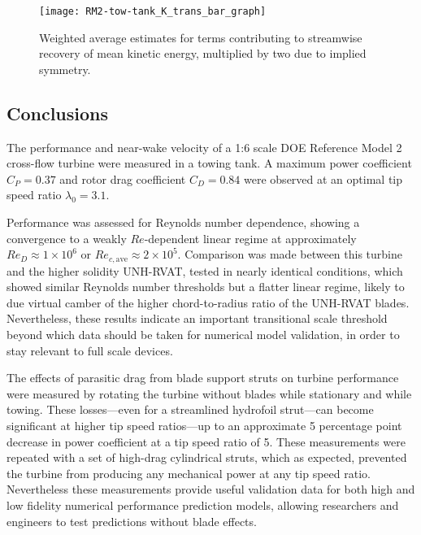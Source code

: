 \begin{figure}
    \centering

    \texttt{[image: RM2-tow-tank\_K\_trans\_bar\_graph]}
    
    \caption{Weighted average estimates for terms contributing to streamwise
        recovery of mean kinetic energy, multiplied by two due to implied symmetry.}
    
    \label{fig:Ktransport}
\end{figure}


\subsection{Conclusions}

The performance and near-wake velocity of a 1:6 scale DOE Reference Model 2
cross-flow turbine were measured in a towing tank. A maximum power coefficient
$C_P = 0.37$ and rotor drag coefficient $C_D = 0.84$ were observed at an optimal
tip speed ratio $\lambda_0 = 3.1$.

Performance was assessed for Reynolds number dependence, showing a convergence
to a weakly $Re$-dependent linear regime at approximately $Re_D \approx 1 \times
10^6$ or $Re_{c,\mathrm{ave}} \approx 2 \times 10^5$. Comparison was made
between this turbine and the higher solidity UNH-RVAT, tested in nearly
identical conditions, which showed similar Reynolds number thresholds but a
flatter linear regime, likely to due virtual camber of the higher
chord-to-radius ratio of the UNH-RVAT blades. Nevertheless, these results
indicate an important transitional scale threshold beyond which data should be
taken for numerical model validation, in order to stay relevant to full scale
devices.

The effects of parasitic drag from blade support struts on turbine performance
were measured by rotating the turbine without blades while stationary and while
towing. These losses---even for a streamlined hydrofoil strut---can become
significant at higher tip speed ratios---up to an approximate 5 percentage point
decrease in power coefficient at a tip speed ratio of 5. These measurements were
repeated with a set of high-drag cylindrical struts, which as expected,
prevented the turbine from producing any mechanical power at any tip speed
ratio. Nevertheless these measurements provide useful validation data for both
high and low fidelity numerical performance prediction models, allowing
researchers and engineers to test predictions without blade effects.

